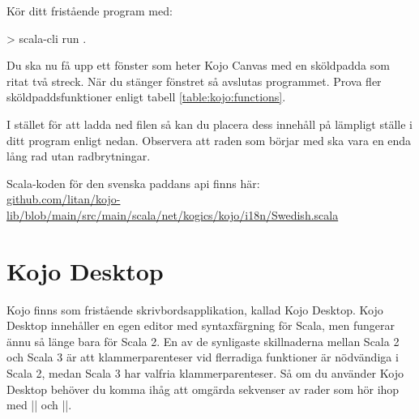 Kör ditt fristående program med:
\begin{REPLnonum}
> scala-cli run .
\end{REPLnonum}

Du ska nu få upp ett fönster som heter Kojo Canvas med en sköldpadda som ritat två streck. När du stänger fönstret så avslutas programmet. Prova fler sköldpaddsfunktioner enligt tabell \ref{table:kojo:functions}.

I stället för att ladda ned filen  så kan du placera dess innehåll på lämpligt ställe i ditt program enligt nedan. Observera att raden som börjar med  ska vara en enda lång rad utan radbrytningar.%


\noindent Scala-koden för den svenska paddans api finns här: \\
\href{https://github.com/litan/kojo-lib/blob/main/src/main/scala/net/kogics/kojo/i18n/Swedish.scala}{github.com/litan/kojo-lib/blob/main/src/main/scala/net/kogics/kojo/i18n/Swedish.scala}





\section{Kojo Desktop}

Kojo finns som fristående skrivbordsapplikation, kallad Kojo Desktop. Kojo Desktop innehåller en egen editor med syntaxfärgning för Scala, men fungerar ännu så länge bara för Scala 2. En av de synligaste skillnaderna mellan Scala 2 och Scala 3 är att klammerparenteser vid flerradiga funktioner är nödvändiga i Scala 2, medan Scala 3 har valfria klammerparenteser. Så om du använder Kojo Desktop behöver du komma ihåg att omgärda sekvenser av rader som hör ihop med \code|{| och \code|}|. 

